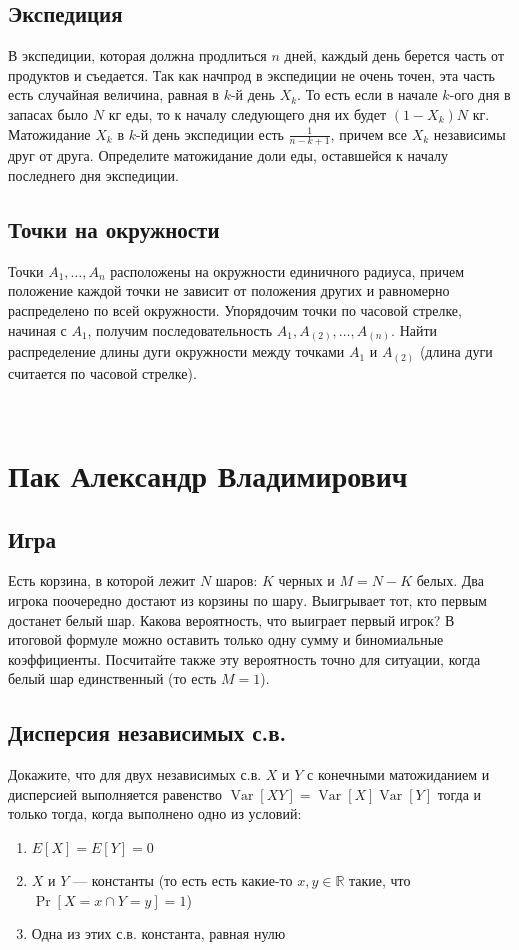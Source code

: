 \documentclass[12pt]{article}
\newcommand\R{\mathbb{R}}
\DeclareMathOperator{\Var}{Var}
\begin{document}
\subsection{Экспедиция}
В экспедиции, которая должна продлиться $n$ дней, каждый день берется часть от продуктов и съедается. Так как начпрод в экспедиции не очень точен, эта часть есть случайная величина, равная в $k$-й день $X_k$. То есть если в начале $k$-ого дня в запасах было $N$ кг еды, то к началу следующего дня их будет $(1 - X_k)N$ кг. Матожидание $X_k$ в $k$-й день экспедиции есть $\frac{1}{n - k + 1}$, причем все $X_k$ независимы друг от друга. Определите матожидание доли еды, оставшейся к началу последнего дня экспедиции.

\subsection{Точки на окружности}
Точки $A_1, \dots, A_n$ расположены на окружности единичного радиуса, причем положение каждой точки не зависит от положения других и равномерно распределено по всей окружности. Упорядочим точки по часовой стрелке, начиная с $A_1$, получим последовательность $A_1, A_{(2)}, \dots, A_{(n)}$. Найти распределение длины дуги окружности между точками $A_1$ и $A_{(2)}$ (длина дуги считается по часовой стрелке).

\newpage
~
\newpage
\section{Пак Александр Владимирович}

\subsection{Игра}
Есть корзина, в которой лежит $N$ шаров: $K$ черных и $M = N - K$ белых. Два игрока поочередно достают из корзины по шару. Выигрывает тот, кто первым достанет белый шар. Какова вероятность, что выиграет первый игрок? В итоговой формуле можно оставить только одну сумму и биномиальные коэффициенты. Посчитайте также эту вероятность точно для ситуации, когда белый шар единственный (то есть $M = 1$).

\subsection{Дисперсия независимых с.в.}
Докажите, что для двух независимых с.в. $X$ и $Y$ с конечными матожиданием и дисперсией выполняется равенство $\Var[XY] = \Var[X]\Var[Y]$ тогда и только тогда, когда выполнено одно из условий:
\begin{enumerate}
    \item $E[X] = E[Y] = 0$
    \item $X$ и $Y$ --- константы (то есть есть какие-то $x, y \in \R$ такие, что $\Pr[X = x \cap Y = y] = 1$)
    \item Одна из этих с.в. константа, равная нулю
\end{enumerate}
\end{document}
